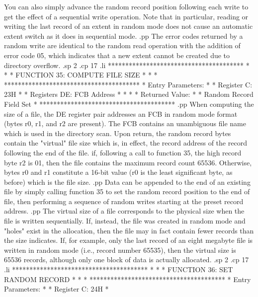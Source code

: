 You can also simply advance the random record position
following each write to get the effect of a sequential
write operation.  Note that in particular, reading or
writing the last record of an extent in random mode
does not cause an automatic extent switch as it does
in sequential mode.
.pp
The error codes returned by a random write are identical
to the random read operation with the addition of error
code 05, which indicates that a new extent cannot be
created due to directory overflow.
.sp 2
.cp 17
.li
***************************************
*                                     *
*  FUNCTION 35: COMPUTE FILE SIZE     *
*                                     *
***************************************
*  Entry Parameters:                  *
*      Register   C:  23H             *
*      Registers DE:  FCB Address     *
*                                     *
*  Returned   Value:                  *
*      Random Record Field Set        *
***************************************
.pp
When computing the size of a file, the DE register pair addresses an FCB in random mode
format (bytes r0, r1, and r2 are present).  The FCB contains
an unambiguous file name which is used in the directory
scan.  Upon return, the random record bytes contain the
"virtual" file size which is, in effect, the record
address of the record following the end of the file.
if, following a call to function 35, the high record
byte r2 is 01, then the file contains the maximum record
count 65536.  Otherwise, bytes r0 and r1
constitute a 16-bit value (r0 is the least significant byte,
as before) which is the file size.
.pp
Data can be appended to the end of an existing
file by simply calling function 35 to set the random
record position to the end of file, then performing a
sequence of random writes starting at the preset record
address.
.pp
The virtual size of a file corresponds to the physical
size when the file is written sequentially.  If, instead,
the file was created in random mode and "holes" exist
in the allocation, then the file may in fact contain
fewer records than the size indicates.  If, for example,
only the last record of an eight megabyte file is written
in random mode (i.e., record number 65535), then the
virtual size is 65536 records, although only one
block of data is actually allocated.
.sp 2
.cp 17
.li
***************************************
*                                     *
*  FUNCTION 36: SET RANDOM RECORD     *
*                                     *
***************************************
*  Entry Parameters:                  *
*      Register   C:  24H             *
